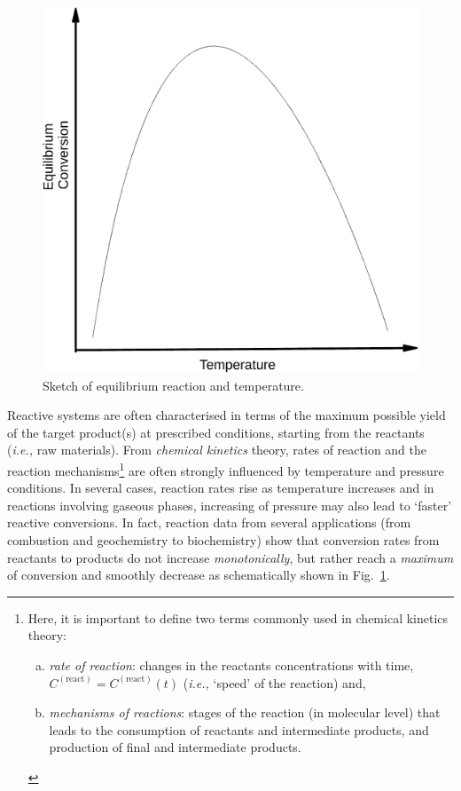 \documentclass[12pts,a4paper,amsmath,amssymb,floatfix]{article}%
\newcommand{\ie}{{\it i.e., }}
\newcommand{\mfr}[3][error]{#1_{#2}^{\left(#3\right)}}
\newcounter{reaction}
\begin{document}
      \begin{figure}%
         \begin{center}
           \includegraphics[width=0.5\columnwidth,clip]{./Figs/Mod06_SchematicEqReaction_Temp_b}
           \caption{Sketch of equilibrium reaction and temperature.}\label{Mod06Fig01}
         \end{center}
       \end{figure}%
      Reactive systems are often characterised in terms of the maximum possible yield of the target product(s) at prescribed conditions, starting from the reactants (\ie raw materials). From {\it chemical kinetics} theory, rates of reaction and the reaction mechanisms\footnote{Here, it is important to define two terms commonly used in chemical kinetics theory:
        \begin{enumerate}[a)]
           \item {\it rate of reaction}: changes in the reactants concentrations with time, $\mfr[C]{}{\text{react}}=\mfr[C]{}{\text{react}}(t)$ (\ie `speed' of the reaction) and,
           \item {\it mechanisms of reactions}: stages of the reaction (in molecular level) that leads to the consumption of reactants and intermediate products, and production of final and intermediate products.
        \end{enumerate}
         }
        are often strongly influenced by temperature and pressure conditions. In several cases, reaction rates rise as temperature increases and in reactions involving gaseous phases, increasing of pressure may also lead to `faster' reactive conversions. In fact, reaction data from several applications (from combustion and geochemistry to biochemistry) show that conversion rates from reactants to products do not increase {\it monotonically}, but rather reach a {\it maximum} of conversion and smoothly decrease as schematically shown in Fig.~\ref{Mod06Fig01}.
\end{document}
